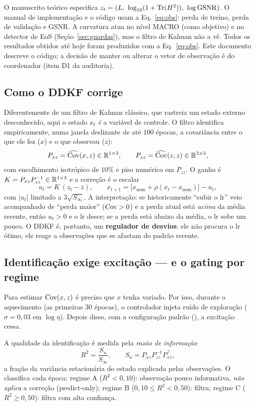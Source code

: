 \begin{alerta}
O manuscrito teórico especifica $z_t=(L,\ \log_{10}(1+\Tr(H^2)),\ \log\GSNR)$. O manual de implementação e o código usam a Eq.~\eqref{eq:obs}: perda de treino, perda de validação e GSNR. A curvatura atua no nível MACRO (como objetivo) e no detector de EoS (Seção~\ref{sec:guardas}), mas o filtro de Kalman não a vê. Todos os resultados obtidos até hoje foram produzidos com a Eq.~\eqref{eq:obs}. Este documento descreve o código; a decisão de manter ou alterar o vetor de observação é do coordenador (item D1 da auditoria).
\end{alerta}

\subsection{Como o DDKF corrige}
Diferentemente de um filtro de Kalman clássico, que rastreia um estado externo desconhecido, aqui o estado $x_t$ \emph{é} a variável de controle. O filtro identifica empiricamente, numa janela deslizante de até $100$ épocas, a covariância entre o que ele fez ($x$) e o que observou ($z$):
\[
P_{xz}=\widehat{\operatorname{Cov}}(x,z)\in\mathbb{R}^{1\times3},\qquad P_{zz}=\widehat{\operatorname{Cov}}(z,z)\in\mathbb{R}^{3\times3},
\]
com encolhimento isotrópico de $10\%$ e piso numérico em $P_{zz}$.
O ganho é $K=P_{xz}P_{zz}^{-1}\in\mathbb{R}^{1\times3}$ e a correção é o escalar
\[
u_t=K\,(z_t-\bar z),\qquad x_{t+1}=\big[x_{\text{nom}}+\rho(x_t-x_{\text{nom}})\big]-u_t ,
\]
com $|u_t|$ limitado a $3\sqrt{S_\infty}$. A interpretação: se historicamente ``subir o lr'' veio acompanhado de ``perda maior'' ($\operatorname{Cov}>0$) e a perda atual está \emph{acima} da média recente, então $u_t>0$ e o lr desce; se a perda está abaixo da média, o lr sobe um pouco. O DDKF é, portanto, um \textbf{regulador de desvios}: ele não procura o lr ótimo, ele reage a observações que se afastam do padrão recente.

\subsection{Identificação exige excitação --- e o gating por regime}
Para estimar $\operatorname{Cov}(x,z)$ é preciso que $x$ tenha variado. Por isso, durante o aquecimento (as primeiras $30$ épocas), o controlador injeta ruído de exploração ($\sigma=0{,}03$ em $\log\eta$). Depois disso, com a configuração padrão (), a excitação cessa.

A qualidade da identificação é medida pela \emph{razão de informação}
\[
R^2=\frac{S_u}{S_\infty},\qquad S_u=P_{xz}P_{zz}^{-1}P_{xz}^\top ,
\]
a fração da variância estacionária do estado explicada pelas observações. O  classifica cada época: regime A ($R^2<0{,}10$): observação pouco informativa, \emph{não aplica} a correção (predict-only); regime B ($0{,}10\le R^2<0{,}50$): filtra; regime C ($R^2\ge0{,}50$): filtra com alta confiança.

